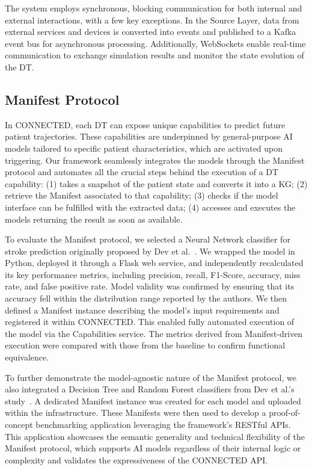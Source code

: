 The system employs synchronous, blocking communication for both internal and external interactions, with a few key exceptions. In the Source Layer, data from external services and devices is converted into events and published to a Kafka event bus for asynchronous processing. Additionally, WebSockets enable real-time communication to exchange simulation results and monitor the state evolution of the DT.
%
\subsection{Manifest Protocol}\label{sec:paper6_manifest_protocol}
In CONNECTED, each DT can expose unique capabilities to predict future patient trajectories. These capabilities are underpinned by general-purpose AI models tailored to specific patient characteristics, which are activated upon triggering. Our framework seamlessly integrates the models through the Manifest protocol and automates all the crucial steps behind the execution of a DT capability: (1) takes a snapshot of the patient state and converts it into a KG; (2) retrieve the Manifest associated to that capability; (3) checks if the model interface can be fulfilled with the extracted data; (4) accesses and executes the models returning the result as soon as available.

To evaluate the Manifest protocol, we selected a Neural Network classifier for stroke prediction originally proposed by Dev et al.~\cite{dev_predictive_2022}. We wrapped the model in Python, deployed it through a Flask web service, and independently recalculated its key performance metrics, including precision, recall, F1-Score, accuracy, miss rate, and false positive rate. Model validity was confirmed by ensuring that its accuracy fell within the distribution range reported by the authors. We then defined a Manifest instance describing the model's input requirements and registered it within CONNECTED. This enabled fully automated execution of the model via the Capabilities service. The metrics derived from Manifest-driven execution were compared with those from the baseline to confirm functional equivalence.

To further demonstrate the model-agnostic nature of the Manifest protocol, we also integrated a Decision Tree and Random Forest classifiers from Dev et al.'s study~\cite{dev_predictive_2022}. A dedicated Manifest instance was created for each model and uploaded within the infrastructure. These Manifests were then used to develop a proof-of-concept benchmarking application leveraging the framework’s RESTful APIs. This application showcases the semantic generality and technical flexibility of the Manifest protocol, which supports AI models regardless of their internal logic or complexity and validates the expressiveness of the CONNECTED API.

